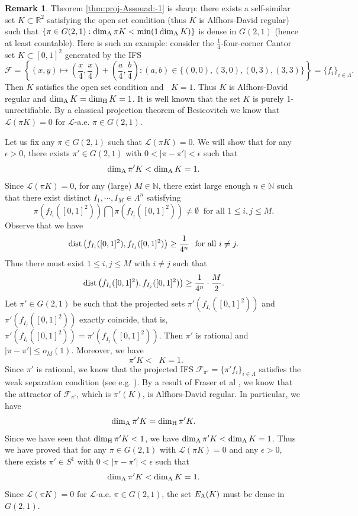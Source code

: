 \documentclass[a4paper,11pt]{amsart}
\theoremstyle{definition}
\newtheorem{remark}[theorem]{Remark}
\numberwithin{equation}{section}
\def\F{\mathcal F}
\def\N{\mathbb N}
\def\R{\mathbb R}
\DeclareMathOperator{\dimH}{dim_H}
\def\l{\left}
\def\r{\right}
\DeclareMathOperator{\dist}{{\rm dist}}
\begin{document}
\begin{remark}
Theorem \ref{thm:proj-Assouad:-1} is sharp: there exists a self-similar set $K\subset \R^2$ satisfying the open set condition (thus $K$ is Alfhors-David regular) such that $\{\pi\in G(2,1): \dim_{\rm A}\pi K<\min(1\dim_{\rm A}K)\}$ is dense in $G(2,1)$ (hence at least countable). Here is such an example: consider the $\frac{1}{4}$-four-corner Cantor set $K\subset [0,1]^2$ generated by the IFS 
\[
\F=\l\{(x,y)\mapsto \l(\frac{x}{4},\frac{x}{4}\r)+\l(\frac{a}{4},\frac{b}{4}\r): (a,b)\in \{(0,0),(3,0),(0,3),(3,3)\}\r\}=\{f_i\}_{i\in\Lambda}.
\]
Then $K$ satisfies the open set condition and $\dimH K=1$.  Thus $K$ is Alfhors-David regular and $\dim_{\rm A}K=\dim_{\rm H}K=1$.  It is well known that the set $K$ is purely 1-unrectifiable.  By a classical projection theorem  of Besicovitch we know that $\mathcal{L}(\pi K)=0$ for $\mathcal{L}$-a.e.  $\pi\in G(2,1)$.  

Let us fix any $\pi\in G(2,1)$ such that $\mathcal{L}(\pi K)=0$.   We will show that for any $\epsilon>0$, there exists $\pi'\in G(2,1)$ with $0<|\pi-\pi'|<\epsilon$ such that
\[
\dim_{\rm A}\pi'K<\dim_{\rm A} K=1.
\]
Since $\mathcal{L}(\pi K)=0$, for any (large) $M\in \N$, there exist large enough $n\in\N$ such that there exist distinct $I_1,\cdots, I_M\in \Lambda^n$ satisfying 
\[
\pi (f_{I_i}([0,1]^2))\bigcap \pi (f_{I_j}([0,1]^2))\neq \emptyset \ \textrm{ for all } 1\le i,j\le M.
\]
Observe that we have
\[
\dist\l(f_{I_i}([0,1]^2),f_{I_j}([0,1]^2)\r)\ge \frac{1}{4^n}\  \textrm{ for all } i\neq j.
\]
Thus there must exist $1\le i,j\le M$ with $i\neq j$ such that 
\[
\dist\l(f_{I_i}([0,1]^2),f_{I_j}([0,1]^2)\r)\ge \frac{1}{4^n}\cdot \frac{M}{2}.
\]
Let $\pi'\in G(2,1)$ be such that the projected sets $\pi'(f_{I_i}([0,1]^2))$ and $\pi'(f_{I_j}([0,1]^2))$ exactly coincide, that is, $\pi'(f_{I_i}([0,1]^2))=\pi'(f_{I_j}([0,1]^2))$.
Then $\pi'$ is rational  and $|\pi-\pi'|\le o_M(1)$.  Moreover, we have 
\[
\dimH \pi' K<\dimH K=1.
\]
Since $\pi'$ is rational, we know that the projected IFS $\F_{\pi'}=\{\pi' f_i\}_{i\in \Lambda}$ satisfies the weak separation condition (see e.g.  \cite{Ruiz}).  By a result of Fraser et al \cite{FHOR}, we know that the attractor of $\F_{\pi'}$, which is $\pi'(K)$, is Alfhors-David regular.  In particular, we have 
\[
\dim_{\rm A}\pi' K=\dim_{\rm H}\pi' K.
\]
Since we have seen that $\dim_{\rm H}\pi' K<1$, we have $\dim_{\rm A}\pi' K<\dim_{\rm A}K=1$. 
Thus we have proved that for any $\pi\in G(2,1)$ with $\mathcal{L}(\pi  K)=0$ and any $\epsilon>0$,  there exists $\pi' \in S^1$ with $0<|\pi-\pi'|<\epsilon$ such that
\[
\dim_{\rm A}\pi' K<\dim_{\rm A} K=1.
\]
Since $\mathcal{L}(\pi  K)=0$ for $\mathcal{L}$-a.e. $\pi\in G(2,1)$,  the set $E_{\rm A}(K)$ must be dense in $G(2,1)$.

\end{remark}
\end{document}
